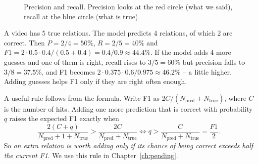 \documentclass[11pt,openany]{book}
\begin{document}
\begin{figure}[h]
\centering
{}
\caption{Precision and recall. Precision looks at the red circle (what we said), recall at the blue circle (what is true).}
\label{fig:venn}
\end{figure}

\begin{keyidea}
A video has 5 true relations. The model predicts 4 relations, of which 2 are correct. Then $P=2/4=50\%$, $R=2/5=40\%$ and
$F1 = 2\cdot 0.5\cdot 0.4/(0.5+0.4) = 0.4/0.9 \approx 44.4\%$. If the model adds 4 more guesses and one of them is right, recall
rises to $3/5=60\%$ but precision falls to $3/8=37.5\%$, and F1 becomes $2\cdot0.375\cdot0.6/0.975\approx 46.2\%$ -- a little higher.
Adding guesses helps F1 only if they are right often enough.
\end{keyidea}

A useful rule follows from the formula. Write F1 as $2C/(N_{\text{pred}}+N_{\text{true}})$, where $C$ is the number of hits. Adding
one more prediction that is correct with probability $q$ raises the expected F1 exactly when
\[ \frac{2(C+q)}{N_{\text{pred}}+1+N_{\text{true}}} > \frac{2C}{N_{\text{pred}}+N_{\text{true}}}
   \iff q > \frac{C}{N_{\text{pred}}+N_{\text{true}}} = \frac{F1}{2}. \]
So \emph{an extra relation is worth adding only if its chance of being correct exceeds half the current F1}. We use this rule in
Chapter~\ref{ch:pending}.
\end{document}
